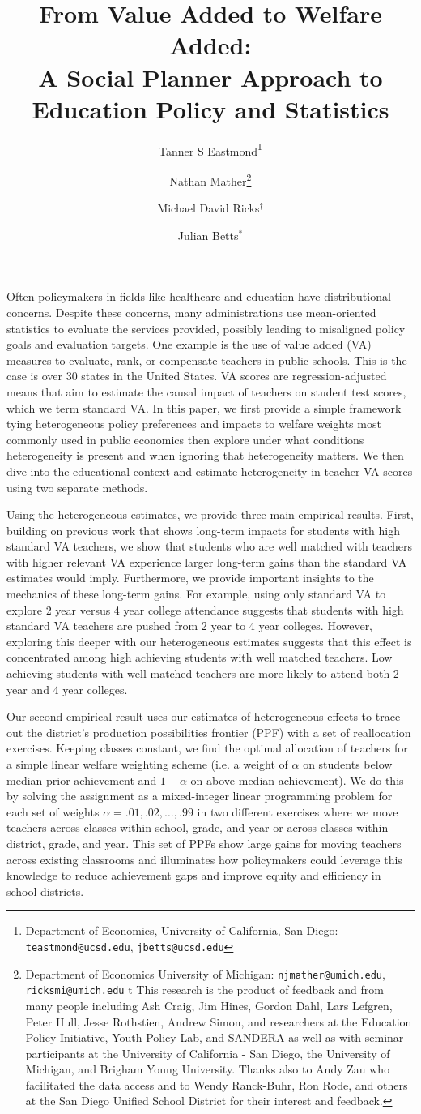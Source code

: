 \documentclass{article}
\title{From Value Added to Welfare Added: \\ A Social Planner Approach to Education Policy and Statistics}
\author{Tanner S Eastmond\thanks{Department of Economics, University of California, San Diego: \texttt{teastmond@ucsd.edu}, \texttt{jbetts@ucsd.edu}} \and Nathan Mather\thanks{Department of Economics University of Michigan: \texttt{njmather@umich.edu}, \texttt{ricksmi@umich.edu} \hspace{11em} {\color{white}t} This research is the product of feedback and from many people including Ash Craig, Jim Hines, Gordon Dahl, Lars Lefgren, Peter Hull, Jesse Rothstien,  Andrew Simon, and  researchers at the Education Policy Initiative, Youth Policy Lab, and SANDERA as well as with seminar participants at the University of California - San Diego, the University of Michigan, and Brigham Young University. Thanks also to Andy Zau who facilitated the data access and to  Wendy Ranck-Buhr, Ron Rode, and others at the San Diego Unified School District for their interest and feedback.} \and Michael David Ricks$^\dagger$ \and Julian Betts$^*$}
\date{\parbox{\linewidth}{\centering%
  This Draft Updated: \today\endgraf
  }}
\theoremstyle{definition}
\theoremstyle{definition}
\theoremstyle{definition}
\begin{document}
Often policymakers in fields like healthcare and education have distributional concerns. Despite these concerns, many administrations use mean-oriented statistics to evaluate the services provided, possibly leading to misaligned policy goals and evaluation targets. One example is the use of value added (VA) measures to evaluate, rank, or compensate teachers in public schools. This is the case is over 30 states in the United States. VA scores are regression-adjusted means that aim to estimate the causal impact of teachers on student test scores, which we term standard VA. In this paper, we first provide a simple framework tying heterogeneous policy preferences and impacts to welfare weights most commonly used in public economics then explore under what conditions heterogeneity is present and when ignoring that heterogeneity matters. We then dive into the educational context and estimate heterogeneity in teacher VA scores using two separate methods.

Using the heterogeneous estimates, we provide three main empirical results. First, building on previous work that shows long-term impacts for students with high standard VA teachers, we show that students who are well matched with teachers with higher relevant VA experience larger long-term gains than the standard VA estimates would imply. Furthermore, we provide important insights to the mechanics of these long-term gains. For example, using only standard VA to explore 2 year versus 4 year college attendance suggests that students with high standard VA teachers are pushed from 2 year to 4 year colleges. However, exploring this deeper with our heterogeneous estimates suggests that this effect is concentrated among high achieving students with well matched teachers. Low achieving students with well matched teachers are more likely to attend both 2 year and 4 year colleges.

Our second empirical result uses our estimates of heterogeneous effects to trace out the district's production possibilities frontier (PPF) with a set of reallocation exercises. Keeping classes constant, we find the optimal allocation of teachers for a simple linear welfare weighting scheme (i.e. a weight of $\alpha$ on students below median prior achievement and $1-\alpha$ on above median achievement). We do this by solving the assignment as a mixed-integer linear programming problem for each set of weights $\alpha = .01, .02, \dots, .99$ in two different exercises where we move teachers across classes within school, grade, and year or across classes within district, grade, and year. This set of PPFs show large gains for moving teachers across existing classrooms and illuminates how policymakers could leverage this knowledge to reduce achievement gaps and improve equity and efficiency in school districts.
\end{document}
